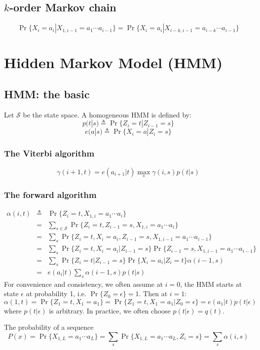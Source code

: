 \documentclass[10pt]{article}
\begin{document}
\subsection{$k$-order Markov chain}
$$
\Pr\{X_i=a_i|X_{1,i-1}=a_1\cdots a_{i-1}\}=\Pr\{X_i=a_i|X_{i-k,i-1}=a_{i-k}\cdots a_{i-1}\}
$$

\section{Hidden Markov Model (HMM)}
\subsection{HMM: the basic}
Let $\mathcal{S}$ be the state space. A homogeneous HMM is defined by:
$$
p(t|s)\triangleq\Pr\{Z_i=t|Z_{i-1}=s\}
$$
$$
e(a|s)\triangleq\Pr\{X_i=a|Z_i=s\}
$$

\subsubsection{The Viterbi algorithm}
$$
\gamma(i+1,t)=e(a_{i+1}|t)\max_s\gamma(i,s)p(t|s)
$$

\subsubsection{The forward algorithm}
\begin{eqnarray*}
\alpha(i,t)&\triangleq&\Pr\{Z_i=t,X_{1,i}=a_1\cdots a_i\}\\
&=&\sum_{s\in\mathcal{S}}\Pr\{Z_i=t,Z_{i-1}=s,X_{1,i}=a_1\cdots a_i\}\\
&=&\sum_s\Pr\{Z_i=t,X_i=a_i,Z_{i-1}=s,X_{1,{i-1}}=a_1\cdots a_{i-1}\}\\
&=&\sum_s\Pr\{Z_i=t,X_i=a_i|Z_{i-1}=s\}\Pr\{Z_{i-1}=s,X_{1,{i-1}}=a_1\cdots a_{i-1}\}\\
&=&\sum_s\Pr\{Z_i=t|Z_{i-1}=s\}\Pr\{X_i=a_i|Z_i=t\}\alpha(i-1,s)\\
&=&e(a_i|t)\sum_s\alpha(i-1,s)p(t|s)
\end{eqnarray*}
For convenience and consistency, we often assume at $i=0$, the HMM starts at
state $\epsilon$ at probability 1, i.e. $\Pr\{Z_0=\epsilon\}=1$. Then at $i=1$:
$$
\alpha(1,t)=\Pr\{Z_1=t,X_1=a_1\}=\Pr\{Z_1=t,X_1=a_1|Z_0=\epsilon\}=e(a_1|t)p(t|\epsilon)
$$
where $p(t|\epsilon)$ is arbitrary. In practice, we often choose
$p(t|\epsilon)=q(t)$.

The probability of a sequence
$$
P(x)=\Pr\{X_{1,L}=a_1\cdots a_L\}=\sum_s\Pr\{X_{1,L}=a_1\cdots a_L,Z_i=s\}=\sum_s\alpha(i,s)
$$
\end{document}
